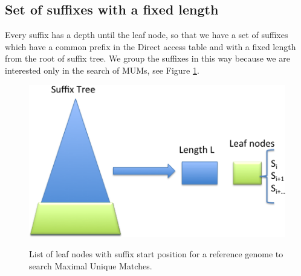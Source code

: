 \documentclass[runningheads,a4paper]{llncs}
\begin{document}
\subsection{Set of suffixes with a fixed length}
Every suffix has a depth until the leaf node, so that we have a set of suffixes which have a common prefix in the Direct access table and with a fixed length from the root of suffix tree. We group the suffixes in this way because we are interested only in the search of MUMs, see Figure \ref{fig:suffixes}.
\begin{figure}
\centering
\includegraphics[scale=0.5]{Leaf.png}
\label{fig:suffixes}
\caption{List of leaf nodes with suffix start position for a reference genome to search Maximal Unique Matches.}
\end{figure}
\end{document}
